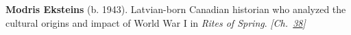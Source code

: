 \textbf{Modris Eksteins} (b. 1943). Latvian-born Canadian historian who analyzed the cultural origins and impact of World War I in \emph{Rites of Spring}. \emph{[Ch.~\hyperref[ch:christmastruce1914]{38}]}


